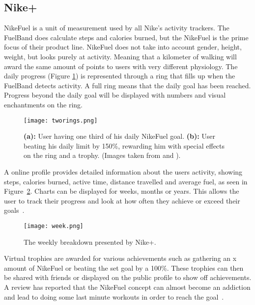 \subsection{Nike+}
NikeFuel \cite{nikefuel} is a unit of measurement used by all Nike's activity trackers. The FuelBand does calculate steps and calories burned, but the NikeFuel is the prime focus of their product line. NikeFuel does not take into account gender, height, weight, but looks purely at activity. Meaning that a kilometer of walking will award the same amount of points to users with very different physiology. The daily progress (Figure \ref{fig:tworings}) is represented through a ring that fills up when the FuelBand detects activity. A full ring means that the daily goal has been reached. Progress beyond the daily goal will be displayed with numbers and visual enchantments on the ring. 

\begin{figure}[h!]
	\centering
		\texttt{[image: tworings.png]}
		\caption{\footnotesize \textbf{(a):} User having one third of his daily NikeFuel goal. \textbf{(b):} User beating his daily limit by 150\%, rewarding him with special effects on the ring and a trophy. (Images taken from \cite{fuelbandDcRain} and \cite{fuelbandTechSpce}).}
		\label{fig:tworings}
\end{figure}

A online profile provides detailed information about the users activity, showing steps, calories burned, active time, distance travelled and average fuel, as seen in Figure~\ref{fig:activityBreakdown}. Charts can be displayed for weeks, months or years. This allows the user to track their progress and look at how often they achieve or exceed their goals~\cite{fuelbandTechSpce}. 

\begin{figure}[h!]
	\centering
		\texttt{[image: week.png]}
		\caption{\footnotesize The weekly breakdown presented by Nike+. \cite{fuelbandTechSpce}}
		\label{fig:activityBreakdown}
\end{figure}

Virtual trophies are awarded for various achievements such as gathering an x amount of NikeFuel or beating the set goal by a 100\%. These trophies can then be shared with friends or displayed on the public profile to show off achievements. A review has reported that the NikeFuel concept can almost become an addiction and lead to doing some last minute workouts in order to reach the goal~\cite{fuelbandDcRain}.

